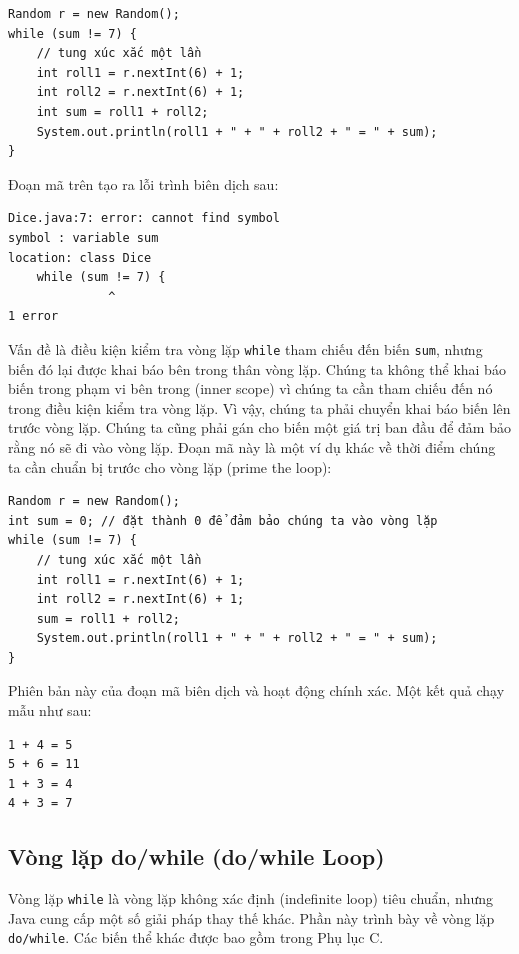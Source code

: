 \begin{verbatim}
Random r = new Random();
while (sum != 7) {
    // tung xúc xắc một lần
    int roll1 = r.nextInt(6) + 1;
    int roll2 = r.nextInt(6) + 1;
    int sum = roll1 + roll2;
    System.out.println(roll1 + " + " + roll2 + " = " + sum);
}
\end{verbatim}

Đoạn mã trên tạo ra lỗi trình biên dịch sau:

\begin{verbatim}
Dice.java:7: error: cannot find symbol
symbol : variable sum
location: class Dice
    while (sum != 7) {
              ^
1 error
\end{verbatim}

Vấn đề là điều kiện kiểm tra vòng lặp \texttt{while} tham chiếu đến biến \texttt{sum}, nhưng biến đó lại được khai báo bên trong thân vòng lặp. Chúng ta không thể khai báo biến trong phạm vi bên trong (inner scope) vì chúng ta cần tham chiếu đến nó trong điều kiện kiểm tra vòng lặp. Vì vậy, chúng ta phải chuyển khai báo biến lên trước vòng lặp. Chúng ta cũng phải gán cho biến một giá trị ban đầu để đảm bảo rằng nó sẽ đi vào vòng lặp. Đoạn mã này là một ví dụ khác về thời điểm chúng ta cần chuẩn bị trước cho vòng lặp (prime the loop):

\begin{verbatim}
Random r = new Random();
int sum = 0; // đặt thành 0 để đảm bảo chúng ta vào vòng lặp
while (sum != 7) {
    // tung xúc xắc một lần
    int roll1 = r.nextInt(6) + 1;
    int roll2 = r.nextInt(6) + 1;
    sum = roll1 + roll2;
    System.out.println(roll1 + " + " + roll2 + " = " + sum);
}
\end{verbatim}

Phiên bản này của đoạn mã biên dịch và hoạt động chính xác. Một kết quả chạy mẫu như sau:

\begin{verbatim}
1 + 4 = 5 
5 + 6 = 11 
1 + 3 = 4 
4 + 3 = 7 
\end{verbatim}

\subsection*{Vòng lặp do/while (do/while Loop)}

Vòng lặp \texttt{while} là vòng lặp không xác định (indefinite loop) tiêu chuẩn, nhưng Java cung cấp một số giải pháp thay thế khác. Phần này trình bày về vòng lặp \texttt{do/while}. Các biến thể khác được bao gồm trong Phụ lục C.

